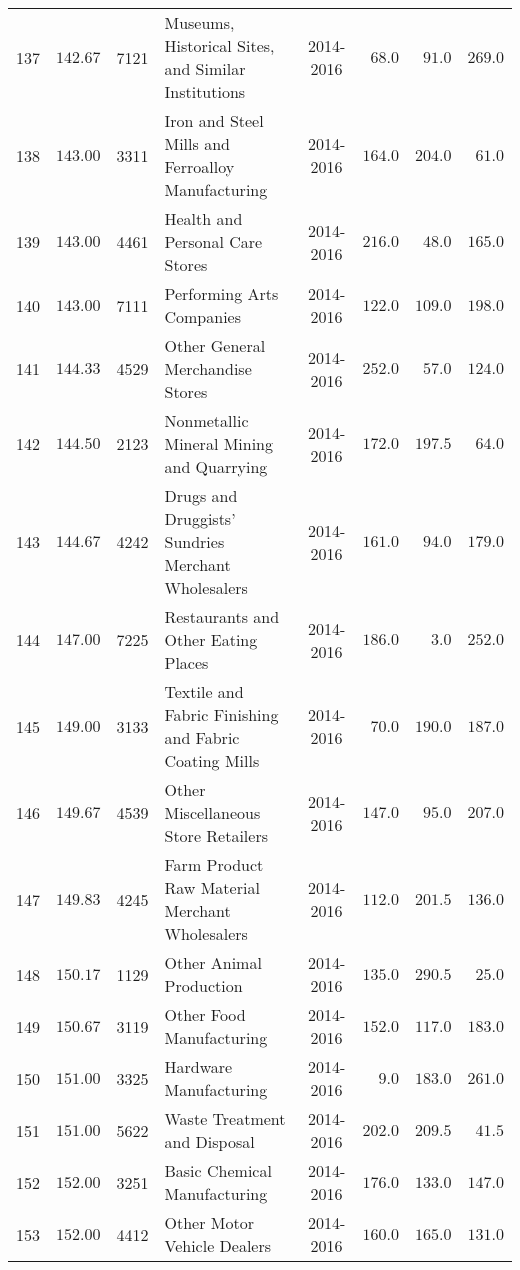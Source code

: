 \documentclass[9pt, oneside]{article}   	%
\begin{document}
\begin{longtable}{cccp{2.0in}cccc}
137  & $142.67$ & 7121 & Museums, Historical Sites, and Similar Institutions & 2014-2016 & $\phantom{0}68.0$ & $\phantom{0}91.0$ & $269.0$ \\
138  & $143.00$ & 3311 & Iron and Steel Mills and Ferroalloy Manufacturing & 2014-2016 & $164.0$ & $204.0$ & $\phantom{0}61.0$ \\
139  & $143.00$ & 4461 & Health and Personal Care Stores & 2014-2016 & $216.0$ & $\phantom{0}48.0$ & $165.0$ \\
140  & $143.00$ & 7111 & Performing Arts Companies & 2014-2016 & $122.0$ & $109.0$ & $198.0$ \\
141  & $144.33$ & 4529 & Other General Merchandise Stores & 2014-2016 & $252.0$ & $\phantom{0}57.0$ & $124.0$ \\
142  & $144.50$ & 2123 & Nonmetallic Mineral Mining and Quarrying & 2014-2016 & $172.0$ & $197.5$ & $\phantom{0}64.0$ \\
143  & $144.67$ & 4242 & Drugs and Druggists' Sundries Merchant Wholesalers & 2014-2016 & $161.0$ & $\phantom{0}94.0$ & $179.0$ \\
144  & $147.00$ & 7225 & Restaurants and Other Eating Places & 2014-2016 & $186.0$ & $\phantom{00}3.0$ & $252.0$ \\
145  & $149.00$ & 3133 & Textile and Fabric Finishing and Fabric Coating Mills & 2014-2016 & $\phantom{0}70.0$ & $190.0$ & $187.0$ \\
146  & $149.67$ & 4539 & Other Miscellaneous Store Retailers & 2014-2016 & $147.0$ & $\phantom{0}95.0$ & $207.0$ \\
147  & $149.83$ & 4245 & Farm Product Raw Material Merchant Wholesalers & 2014-2016 & $112.0$ & $201.5$ & $136.0$ \\
148  & $150.17$ & 1129 & Other Animal Production & 2014-2016 & $135.0$ & $290.5$ & $\phantom{0}25.0$ \\
149  & $150.67$ & 3119 & Other Food Manufacturing & 2014-2016 & $152.0$ & $117.0$ & $183.0$ \\
150  & $151.00$ & 3325 & Hardware Manufacturing & 2014-2016 & $\phantom{00}9.0$ & $183.0$ & $261.0$ \\
151  & $151.00$ & 5622 & Waste Treatment and Disposal & 2014-2016 & $202.0$ & $209.5$ & $\phantom{0}41.5$ \\
152  & $152.00$ & 3251 & Basic Chemical Manufacturing & 2014-2016 & $176.0$ & $133.0$ & $147.0$ \\
153  & $152.00$ & 4412 & Other Motor Vehicle Dealers & 2014-2016 & $160.0$ & $165.0$ & $131.0$ \\

\end{longtable}
\end{document}
